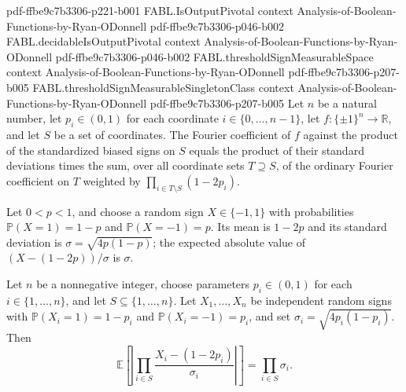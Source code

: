 \begin{theorem}
{    pdf-ffbe9c7b3306-p221-b001}
\proofstep
  {FABL.IsOutputPivotal}
  {context}
  {Analysis-of-Boolean-Functions-by-Ryan-ODonnell}
  {pdf-ffbe9c7b3306-p046-b002}
\proofstep
  {FABL.decidableIsOutputPivotal}
  {context}
  {Analysis-of-Boolean-Functions-by-Ryan-ODonnell}
  {pdf-ffbe9c7b3306-p046-b002}
\proofstep
  {FABL.thresholdSignMeasurableSpace}
  {context}
  {Analysis-of-Boolean-Functions-by-Ryan-ODonnell}
  {pdf-ffbe9c7b3306-p207-b005}
\proofstep
  {FABL.thresholdSignMeasurableSingletonClass}
  {context}
  {Analysis-of-Boolean-Functions-by-Ryan-ODonnell}
  {pdf-ffbe9c7b3306-p207-b005}
Let $n$ be a natural number, let $p_i\in(0,1)$ for each coordinate
$i\in\{0,\ldots,n-1\}$, let $f:\{\pm1\}^n\to\mathbb R$, and let $S$ be a set of
coordinates. The Fourier coefficient of $f$ against the product of the standardized
biased signs on $S$ equals the product of their standard deviations times the sum, over
all coordinate sets $T\supseteq S$, of the ordinary Fourier coefficient on $T$ weighted
by $\prod_{i\in T\setminus S}(1-2p_i)$.
\end{theorem}

\begin{theorem}
\label{FABL.pmfExpectation_abs_biasedStandardizedSign}
\leanok
{}
Let $0<p<1$, and choose a random sign $X\in\{-1,1\}$ with probabilities
$\mathbb{P}(X=1)=1-p$ and $\mathbb{P}(X=-1)=p$. Its mean is $1-2p$ and its standard
deviation is $\sigma=\sqrt{4p(1-p)}$; the expected absolute value of $(X-(1-2p))/\sigma$
is $\sigma$.
\end{theorem}

\begin{theorem}
\label{FABL.pmfExpectation_abs_heterogeneousBiasedMonomial}
\leanok
{}
Let $n$ be a nonnegative integer, choose parameters $p_i\in(0,1)$ for each
$i\in\{1,\ldots,n\}$, and let $S\subseteq\{1,\ldots,n\}$. Let $X_1,\ldots,X_n$ be
independent random signs with $\mathbb{P}(X_i=1)=1-p_i$ and $\mathbb{P}(X_i=-1)=p_i$,
and set $\sigma_i=\sqrt{4p_i(1-p_i)}$. Then
\[\mathbb{E}\left[\left|\prod_{i\in S}\frac{X_i-(1-2p_i)}{\sigma_i}\right|\right]=\prod_{i\in S}\sigma_i.\]
\end{theorem}

